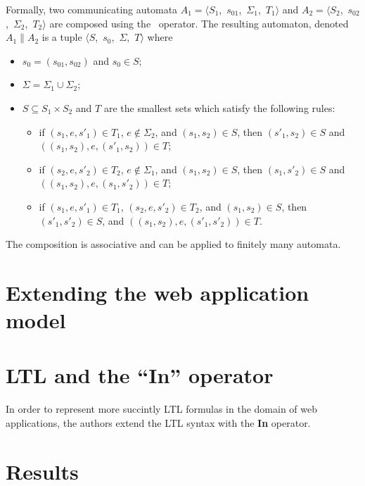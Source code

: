 \documentclass[a4paper,10pt]{article}
\newcommand{\tuple}[1]{\mbox{$\langle$#1$\rangle$}}
\begin{document}
Formally, two communicating automata $A_1 = $\tuple{$S_1$, $s_{01}$, $\Sigma_1$, $T_1$} and $A_2 = $\tuple{$S_2$, $s_{02}$, $\Sigma_2$, $T_2$} are composed using the \parallel\ operator. The resulting automaton, denoted $A_1\parallel A_2$ is a tuple \tuple{$S$, $s_0$, $\Sigma$, $T$} where 

\begin{itemize}
  \item $s_0 = (s_{01}, s_{02})$ and $s_0 \in S$;
  \item $\Sigma = \Sigma_1 \cup \Sigma_2$;
  \item $S \subseteq S_1 \times S_2$ and $T$ are the smallest sets which satisfy the following rules:
    \begin{itemize}
      \item if $(s_1,e,s'_1) \in T_1$, $e \notin \Sigma_2$, and $(s_1,s_2)\in S$, then $(s'_1,s_2)\in S$ and $((s_1,s_2),e,(s'_1,s_2))\in T$;
      \item if $(s_2,e,s'_2) \in T_2$, $e \notin \Sigma_1$, and $(s_1,s_2)\in S$, then $(s_1,s'_2)\in S$ and $((s_1,s_2),e,(s_1,s'_2))\in T$;
      \item if $(s_1,e,s'_1) \in T_1$, $(s_2,e,s'_2) \in T_2$, and $(s_1,s_2) \in S$, then $(s'_1,s'_2) \in S$, and $((s_1,s_2),e,(s'_1,s'_2)) \in T$.
    \end{itemize}
\end{itemize}

The composition is associative and can be applied to finitely many automata.

\section{Extending the web application model}

\section{LTL and the ``In'' operator}
\label{ltl-and-the-in-operator}

In order to represent more succintly LTL formulas in the domain of web
applications, the authors extend the LTL syntax with the \textbf{In}
operator.

\section{Results}
\label{results}

\clearpage
\printbibliography
\end{document}

